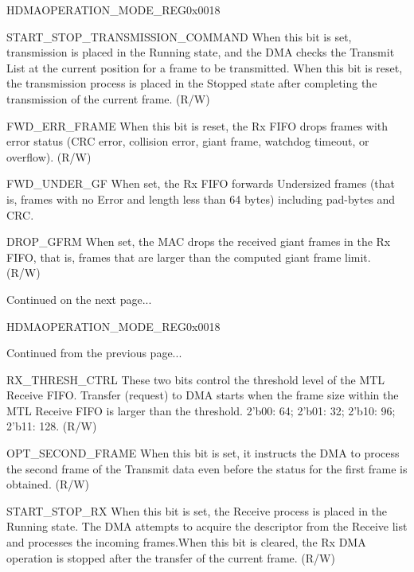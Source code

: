 \begin{register}{H}{DMAOPERATION\_MODE\_REG}{0x0018}
\begin{regdesc}
\begin{reglist}
\item [START\_STOP\_TRANSMISSION\_COMMAND] When this bit is set, transmission is placed in the Running state, and the DMA checks the Transmit List at the current position for a frame to be transmitted. When this bit is reset, the transmission process is placed in the Stopped state after completing the transmission of the current frame. (R/W)
\item [FWD\_ERR\_FRAME] When this bit is reset, the Rx FIFO drops frames with error status (CRC error, collision error, giant frame, watchdog timeout, or overflow). (R/W)
\item [FWD\_UNDER\_GF] When set, the Rx FIFO forwards Undersized frames (that is, frames with no Error and length less than 64 bytes) including pad-bytes and CRC.
\item [DROP\_GFRM] When set, the MAC drops the received giant frames in the Rx FIFO, that is, frames that are larger than the computed giant frame limit. (R/W)

\item [Continued on the next page...]
\end{reglist}\end{regdesc}
\end{register}

\addtocounter{Regfloat}{-1}
\begin{register}{H}{DMAOPERATION\_MODE\_REG}{0x0018}
\begin{regdesc}\begin{reglist}
\item [Continued from the previous page...]
\item [RX\_THRESH\_CTRL] These two bits control the threshold level of the MTL Receive FIFO. Transfer (request) to DMA starts when the frame size within the MTL Receive FIFO is larger than the threshold. 2'b00: 64; 2'b01: 32; 2'b10: 96; 2'b11: 128. (R/W)
\item [OPT\_SECOND\_FRAME] When this bit is set, it instructs the DMA to process the second frame of the Transmit data even before the status for the first frame is obtained. (R/W)
\item [START\_STOP\_RX] When this bit is set, the Receive process is placed in the Running state. The DMA attempts to acquire the descriptor from the Receive list and processes the incoming frames.When this bit is cleared, the Rx DMA operation is stopped after the transfer of the current frame. (R/W)
\end{reglist}\end{regdesc}
\end{register}

